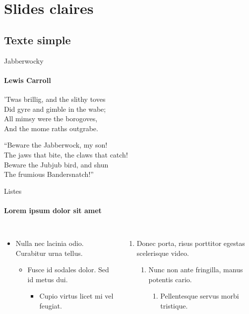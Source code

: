 \documentclass{beamer}
\begin{document}
\section{Slides claires}
\subsection{Texte simple}
\begin{frame}{Jabberwocky}
\framesubtitle{Lewis Carroll}%
'Twas brillig, and the slithy toves\\
Did gyre and gimble in the wabe;\\
All mimsy were the borogoves,\\
And the mome raths outgrabe.\\\bigskip

“Beware the Jabberwock, my son!\\
The jaws that bite, the claws that catch!\\
Beware the Jubjub bird, and shun\\
The frumious Bandersnatch!”\\
\end{frame}

\begin{frame}[label=lists]{Listes}
\framesubtitle{Lorem ipsum dolor sit amet}
\begin{columns}[onlytextwidth]
    \begin{itemize}
    \item Nulla nec lacinia odio. Curabitur urna tellus.
    \begin{itemize}
        \item Fusce id sodales dolor. Sed id metus dui.
        \begin{itemize}
        \item Cupio virtus licet mi vel feugiat.
        \end{itemize}
    \end{itemize}
    \end{itemize}
    \begin{enumerate}
    \item Donec porta, risus porttitor egestas scelerisque video.
    \begin{enumerate}
        \item Nunc non ante fringilla, manus potentis cario.
        \begin{enumerate}
        \item Pellentesque servus morbi tristique.
        \end{enumerate}
    \end{enumerate}
    \end{enumerate}
\end{columns}
\end{frame}
\end{document}
